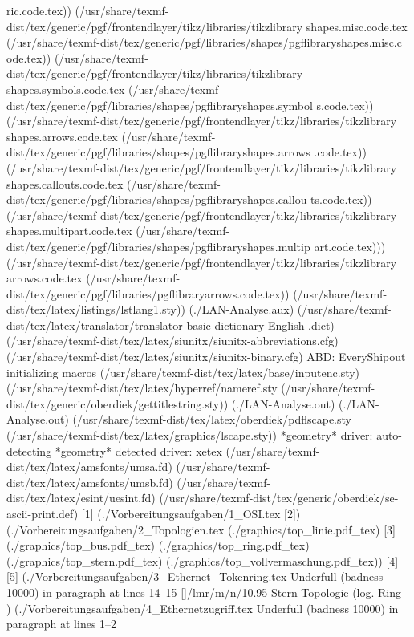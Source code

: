ric.code.tex))
(/usr/share/texmf-dist/tex/generic/pgf/frontendlayer/tikz/libraries/tikzlibrary
shapes.misc.code.tex
(/usr/share/texmf-dist/tex/generic/pgf/libraries/shapes/pgflibraryshapes.misc.c
ode.tex))
(/usr/share/texmf-dist/tex/generic/pgf/frontendlayer/tikz/libraries/tikzlibrary
shapes.symbols.code.tex
(/usr/share/texmf-dist/tex/generic/pgf/libraries/shapes/pgflibraryshapes.symbol
s.code.tex))
(/usr/share/texmf-dist/tex/generic/pgf/frontendlayer/tikz/libraries/tikzlibrary
shapes.arrows.code.tex
(/usr/share/texmf-dist/tex/generic/pgf/libraries/shapes/pgflibraryshapes.arrows
.code.tex))
(/usr/share/texmf-dist/tex/generic/pgf/frontendlayer/tikz/libraries/tikzlibrary
shapes.callouts.code.tex
(/usr/share/texmf-dist/tex/generic/pgf/libraries/shapes/pgflibraryshapes.callou
ts.code.tex))
(/usr/share/texmf-dist/tex/generic/pgf/frontendlayer/tikz/libraries/tikzlibrary
shapes.multipart.code.tex
(/usr/share/texmf-dist/tex/generic/pgf/libraries/shapes/pgflibraryshapes.multip
art.code.tex)))
(/usr/share/texmf-dist/tex/generic/pgf/frontendlayer/tikz/libraries/tikzlibrary
arrows.code.tex
(/usr/share/texmf-dist/tex/generic/pgf/libraries/pgflibraryarrows.code.tex))
(/usr/share/texmf-dist/tex/latex/listings/lstlang1.sty)) (./LAN-Analyse.aux)
(/usr/share/texmf-dist/tex/latex/translator/translator-basic-dictionary-English
.dict) (/usr/share/texmf-dist/tex/latex/siunitx/siunitx-abbreviations.cfg)
(/usr/share/texmf-dist/tex/latex/siunitx/siunitx-binary.cfg)
ABD: EveryShipout initializing macros
(/usr/share/texmf-dist/tex/latex/base/inputenc.sty)
(/usr/share/texmf-dist/tex/latex/hyperref/nameref.sty
(/usr/share/texmf-dist/tex/generic/oberdiek/gettitlestring.sty))
(./LAN-Analyse.out) (./LAN-Analyse.out)
(/usr/share/texmf-dist/tex/latex/oberdiek/pdflscape.sty
(/usr/share/texmf-dist/tex/latex/graphics/lscape.sty))
*geometry* driver: auto-detecting
*geometry* detected driver: xetex
(/usr/share/texmf-dist/tex/latex/amsfonts/umsa.fd)
(/usr/share/texmf-dist/tex/latex/amsfonts/umsb.fd)
(/usr/share/texmf-dist/tex/latex/esint/uesint.fd)
(/usr/share/texmf-dist/tex/generic/oberdiek/se-ascii-print.def) [1]
(./Vorbereitungsaufgaben/1_OSI.tex [2])
(./Vorbereitungsaufgaben/2_Topologien.tex (./graphics/top_linie.pdf_tex)
[3] (./graphics/top_bus.pdf_tex) (./graphics/top_ring.pdf_tex)
(./graphics/top_stern.pdf_tex) (./graphics/top_vollvermaschung.pdf_tex))
[4] [5] (./Vorbereitungsaufgaben/3_Ethernet_Tokenring.tex
Underfull \hbox (badness 10000) in paragraph at lines 14--15
[]\TU/lmr/m/n/10.95 Stern-Topologie (log. Ring-
) (./Vorbereitungsaufgaben/4_Ethernetzugriff.tex
Underfull \hbox (badness 10000) in paragraph at lines 1--2


